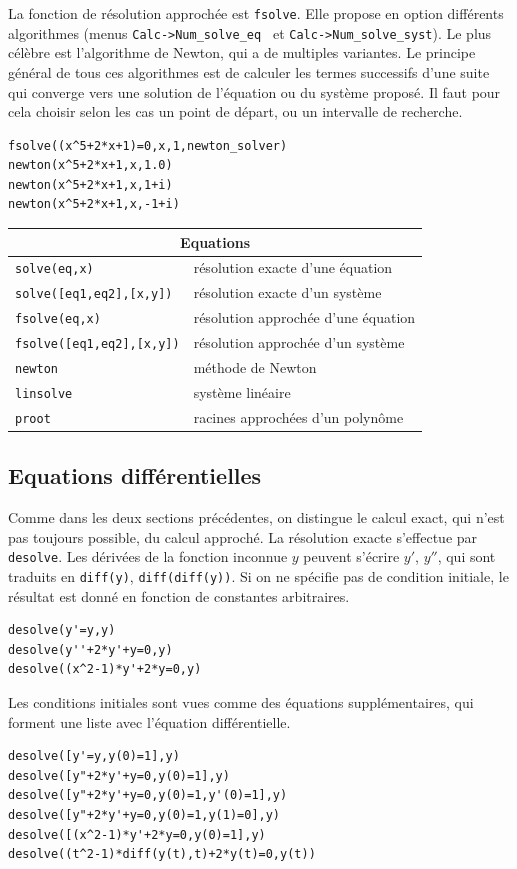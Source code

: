 \documentclass{article}
\begin{document}
La fonction de r\'esolution approch\'ee est \verb|fsolve|. Elle
propose en option diff\'erents algorithmes
(menus \verb|Calc->Num_solve_eq | et \verb|Calc->Num_solve_syst|).
 Le plus c\'el\`ebre est
l'algori\-thme de Newton, qui a de multiples variantes. Le principe
g\'en\'eral de tous ces algorithmes est de calculer les termes
successifs d'une suite qui converge vers une solution de l'\'equation
ou du syst\`eme propos\'e. Il faut pour cela choisir selon les cas
un point de d\'epart, ou un intervalle de recherche.
\begin{verbatim}
fsolve((x^5+2*x+1)=0,x,1,newton_solver)
newton(x^5+2*x+1,x,1.0)
newton(x^5+2*x+1,x,1+i)
newton(x^5+2*x+1,x,-1+i)
\end{verbatim}

\begin{center}
\begin{tabular}{|ll|}
\hline
\multicolumn{2}{|c|}{\bf Equations}\\
\hline\hline
\verb|solve(eq,x)| &r\'esolution exacte d'une \'equation\\
\verb|solve([eq1,eq2],[x,y])| &r\'esolution exacte d'un syst\`eme\\
\verb|fsolve(eq,x)| &r\'esolution approch\'ee d'une \'equation\\
\verb|fsolve([eq1,eq2],[x,y])| &r\'esolution approch\'ee d'un syst\`eme\\
\verb|newton| & m\'ethode de Newton\\
\verb|linsolve| & syst\`eme lin\'eaire\\
\verb|proot| & racines approch\'ees d'un polyn\^ome\\
\hline
\end{tabular}
\end{center}
%
\subsection{Equations diff\'erentielles}
%
Comme dans les deux sections pr\'ec\'edentes, on distingue le
calcul exact, qui n'est pas toujours possible, du calcul
approch\'e. La r\'esolution exacte s'effectue par \verb|desolve|. 
Les d\'eriv\'ees de la fonction inconnue $y$ peuvent s'\'ecrire $y'$,
$y''$, qui sont traduits en \verb|diff(y)|, \verb|diff(diff(y))|.
Si on ne sp\'ecifie pas de condition initiale, le r\'esultat est donn\'e
en fonction de constantes arbitraires.
\begin{verbatim}
desolve(y'=y,y)
desolve(y''+2*y'+y=0,y)
desolve((x^2-1)*y'+2*y=0,y)
\end{verbatim}
Les conditions initiales sont vues comme des \'equations
suppl\'ementaires, qui forment une liste avec l'\'equation 
diff\'erentielle.
\begin{verbatim}
desolve([y'=y,y(0)=1],y)
desolve([y"+2*y'+y=0,y(0)=1],y)
desolve([y"+2*y'+y=0,y(0)=1,y'(0)=1],y)
desolve([y"+2*y'+y=0,y(0)=1,y(1)=0],y)
desolve([(x^2-1)*y'+2*y=0,y(0)=1],y)
desolve((t^2-1)*diff(y(t),t)+2*y(t)=0,y(t))
\end{verbatim}
\end{document}
